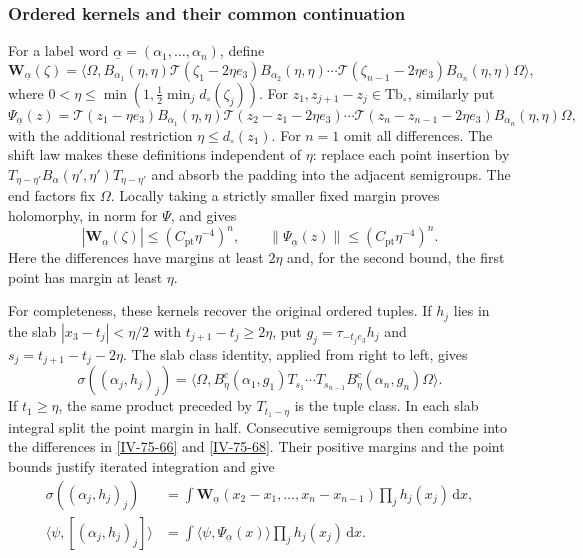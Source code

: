 \documentclass[11pt,letterpaper,reqno]{amsart}
\theoremstyle{definition}
\theoremstyle{remark}
\begin{document}
\subsubsection{Ordered kernels and their common continuation}

For a label word $\underline\alpha=(\alpha_1,\ldots,\alpha_n)$,
define
\begin{equation}\label{IV-75-66}
 \mathbf W_{\underline\alpha}(\zeta)=
 \langle\Omega,B_{\alpha_1}(\eta,\eta)
  \mathcal T(\zeta_1-2\eta e_3)B_{\alpha_2}(\eta,\eta)
  \cdots\mathcal T(\zeta_{n-1}-2\eta e_3)
                        B_{\alpha_n}(\eta,\eta)\Omega\rangle,
\end{equation}
where $0<\eta\le\min(1,\frac12\min_jd_\circ(\zeta_j))$.
For $z_1,z_{j+1}-z_j\in\mathrm{Tb}_\circ$, similarly put
\begin{equation}\label{IV-75-68}
 \Psi_{\underline\alpha}(z)=
 \mathcal T(z_1-\eta e_3)B_{\alpha_1}(\eta,\eta)
 \mathcal T(z_2-z_1-2\eta e_3)\cdots
 \mathcal T(z_n-z_{n-1}-2\eta e_3)
                         B_{\alpha_n}(\eta,\eta)\Omega,
\end{equation}
with the additional restriction $\eta\le d_\circ(z_1)$.
For $n=1$ omit all differences. The shift law makes these
definitions independent of $\eta$: replace each point insertion
by $T_{\eta-\eta'}B_\alpha(\eta',\eta')T_{\eta-\eta'}$
and absorb the padding into the adjacent semigroups.
The end factors fix $\Omega$. Locally taking a strictly smaller
fixed margin proves holomorphy, in norm for $\Psi$, and gives
\begin{equation}\label{IV-75-72}
 |\mathbf W_{\underline\alpha}(\zeta)|\le
                    (C_{\mathrm{pt}}\eta^{-4})^n,
 \qquad
 \|\Psi_{\underline\alpha}(z)\|\le
                    (C_{\mathrm{pt}}\eta^{-4})^n.
\end{equation}
Here the differences have margins at least $2\eta$ and, for
the second bound, the first point has margin at least $\eta$.

For completeness, these kernels recover the original ordered
tuples. If $h_j$ lies in the slab
$|x_3-t_j|<\eta/2$ with $t_{j+1}-t_j\ge2\eta$, put
$g_j=\tau_{-t_je_3}h_j$ and $s_j=t_{j+1}-t_j-2\eta$.
The slab class identity, applied from right to left, gives
\[
 \sigma((\alpha_j,h_j)_j)=
 \langle\Omega,B_\eta^{\mathrm c}(\alpha_1,g_1)T_{s_1}
       \cdots T_{s_{n-1}}B_\eta^{\mathrm c}(\alpha_n,g_n)\Omega\rangle.
\]
If $t_1\ge\eta$, the same product preceded by $T_{t_1-\eta}$
is the tuple class. In each slab integral split the point
margin in half. Consecutive semigroups then combine into the
differences in \eqref{IV-75-66} and \eqref{IV-75-68}.
Their positive margins and the point bounds justify iterated
integration and give
\begin{align}
 \sigma((\alpha_j,h_j)_j)
   &=\int\mathbf W_{\underline\alpha}(x_2-x_1,\ldots,x_n-x_{n-1})
                              \prod_jh_j(x_j)\,\mathrm{d}x,
                                                   \label{IV-75-76}\\
 \langle\psi,[(\alpha_j,h_j)_j]\rangle
   &=\int\langle\psi,\Psi_{\underline\alpha}(x)\rangle
                              \prod_jh_j(x_j)\,\mathrm{d}x.
                                                   \label{IV-75-77}
\end{align}
\end{document}
